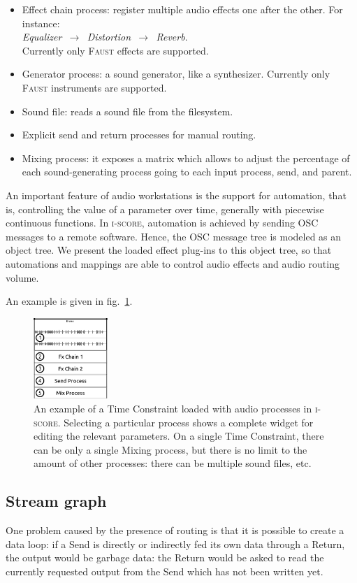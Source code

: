 \documentclass{article}
\newcommand*{\iscore}{\textsc{i-score}\xspace}
\newcommand*{\faust}{\textsc{Faust}\xspace}
\begin{document}
\begin{itemize}
	\item Effect chain process: register multiple audio effects one after the other. 
	For instance:~\\ \emph{ Equalizer $\,\to\,$ Distortion $\,\to\,$ Reverb}. ~\\
	Currently only \faust effects are supported.
	\item Generator process: a sound generator, like a synthesizer. 
	Currently only \faust instruments are supported.
	\item Sound file: reads a sound file from the filesystem.
	\item Explicit send and return processes for manual routing.
	\item Mixing process: it exposes a matrix which allows to adjust the percentage of each sound-generating process going to each input process, send, and parent.
\end{itemize}

An important feature of audio workstations is the support for automation, that is, 
controlling the value of a parameter over time, generally with piecewise continuous functions.
In \iscore, automation is achieved by sending OSC messages to a remote software.
Hence, the OSC message tree is modeled as an object tree.
We present the loaded effect plug-ins to this object tree, so that automations 
and mappings are able to control audio effects and audio routing volume.

An example is given in fig.~\ref{fig.iscoreconstraint}.
\begin{figure}
	\centering
	\includegraphics[width=0.25\textwidth]{figures/iscore1.eps}
	\caption{An example of a Time Constraint loaded with audio processes in \iscore. 
		Selecting a particular process shows a complete widget for editing the relevant parameters. On a single Time Constraint, there can be only a single Mixing process, but there is no limit to the amount of other processes: there can be multiple sound files, etc.}
	\label{fig.iscoreconstraint}
\end{figure}
\subsection{Stream graph}
One problem caused by the presence of routing is that it is possible 
to create a data loop: if a Send is directly or indirectly fed its own data through a Return, 
the output would be garbage data: the Return would be asked to read 
the currently requested output from the Send which has not been written yet.
\end{document}
